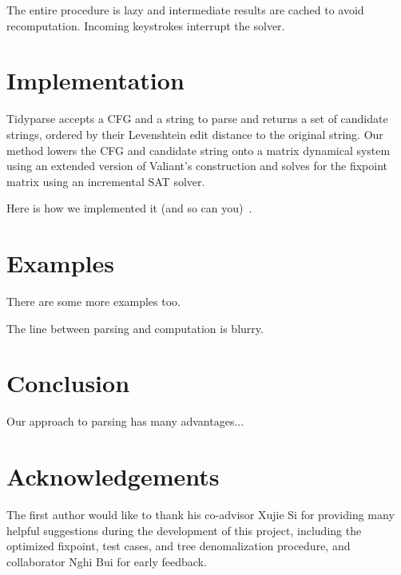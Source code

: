 \documentclass[sigplan,nonacm]{acmart}\settopmatter{printfolios=false,printccs=false,printacmref=false}
\begin{document}
The entire procedure is lazy and intermediate results are cached to avoid recomputation. Incoming keystrokes interrupt the solver.

\section{Implementation}

Tidyparse accepts a CFG and a string to parse and returns a set of candidate strings, ordered by their Levenshtein edit distance to the original string. Our method lowers the CFG and candidate string onto a matrix dynamical system using an extended version of Valiant's construction and solves for the fixpoint matrix using an incremental SAT solver.

    Here is how we implemented it (and so can you)~\cite{valiant1975general}.
\section{Examples}
There are some more examples too.

The line between parsing and computation is blurry.

\section{Conclusion}

Our approach to parsing has many advantages...

\section{Acknowledgements}
The first author would like to thank his co-advisor Xujie Si for providing many helpful suggestions during the development of this project, including the optimized fixpoint, test cases, and tree denomalization procedure, and collaborator Nghi Bui for early feedback.


\end{document}
